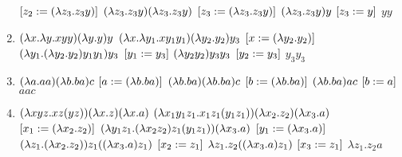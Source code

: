\documentclass[11pt]{article}
\begin{document}
\begin{enumerate}
\([z_2 := ({\lambda}z_3.z_3y)] \\\)
\(({\lambda}z_3.z_3y)({\lambda}z_3.z_3y) \\\)
\([z_3 := ({\lambda}z_3.z_3y)] \\\)
\(({\lambda}z_3.z_3y)y \\\)
\([ z_3 := y ] \\\)
\(yy\)
\item \(({\lambda}x.{\lambda}y.xyy)({\lambda}y.y)y \\\)
\(({\lambda}x.{\lambda}y_1.xy_1y_1)({\lambda}y_2.y_2)y_3 \\\)
\([x := ({\lambda}y_2.y_2)] \\\)
\(({\lambda}y_1.({\lambda}y_2.y_2)y_1y_1)y_3 \\\)
\([ y_1 := y_3 ] \\\)
\(({\lambda}y_2y_2)y_3y_3 \\\)
\([y_2 := y_3] \\\)
\(y_3y_3\)
\item \(({\lambda}a.aa)({\lambda}b.ba)c \\\)
\([a := ({\lambda}b.ba)] \\\)
\(({\lambda}b.ba)({\lambda}b.ba)c \\\)
\([b := ({\lambda}b.ba)] \\\)
\(({\lambda}b.ba)ac \\\)
\([b := a] \\\)
\(aac\)
\item \(({\lambda}xyz.xz(yz))({\lambda}x.z)({\lambda}x.a) \\\)
\(({\lambda}x_1y_1z_1.x_1z_1(y_1z_1)) ({\lambda}x_2.z_2) ({\lambda}x_3.a) \\\)
\([x_1 := ({\lambda}x_2.z_2)] \\\)
\(({\lambda}y_1z_1.({\lambda}x_2z_2)z_1(y_1z_1)) ({\lambda}x_3.a) \\\)
\([y_1 := ({\lambda}x_3.a)] \\\)
\(({\lambda}z_1.({\lambda}x_2.z_2)) z_1 (({\lambda}x_3.a)z_1) \\\)
\([x_2 := z_1] \\\)
\({\lambda}z_1.z_2(({\lambda}x_3.a)z_1) \\\)
\([x_3 := z_1] \\\)
\({\lambda}z_1.z_2a\)
\end{enumerate}
\end{document}
